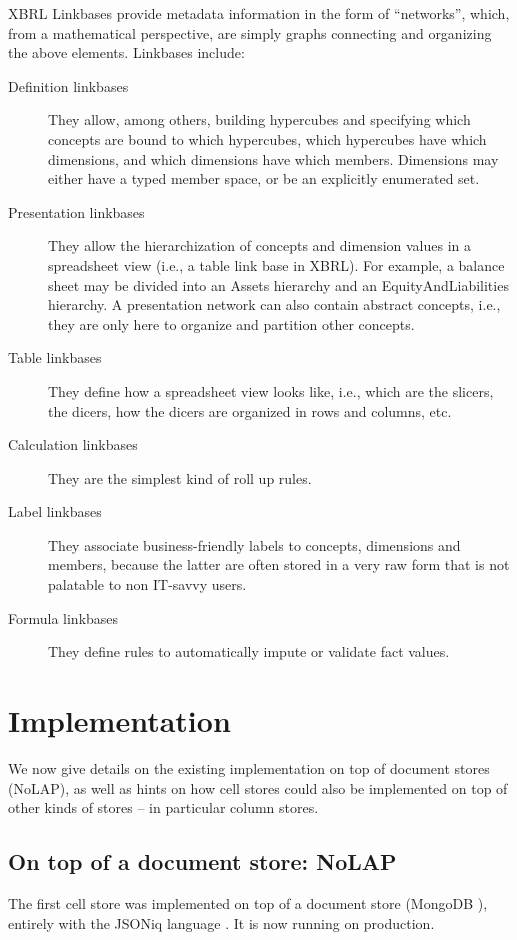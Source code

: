 \documentclass{acm_proc_article-sp}
\begin{document}
XBRL Linkbases provide metadata information in the form of ``networks'', which, from a mathematical perspective, are simply graphs connecting and organizing the above elements. Linkbases include:

\begin{description}
\item[Definition linkbases] They allow, among others, building hypercubes and specifying which concepts are bound to which hypercubes, which hypercubes have which dimensions, and which dimensions have which members. Dimensions may either have a typed member space, or be an explicitly enumerated set. 
\item[Presentation linkbases] They allow the hierarchization of concepts and dimension values in a spreadsheet view (i.e., a table link base in XBRL). For example, a balance sheet may be divided into an Assets hierarchy and an EquityAndLiabilities hierarchy. A presentation network can also contain abstract concepts, i.e., they are only here to organize and partition other concepts. 
\item[Table linkbases] They define how a spreadsheet view looks like, i.e., which are the slicers, the dicers, how the dicers are organized in rows and columns, etc.
\item[Calculation linkbases] They are the simplest kind of roll up rules.
\item[Label linkbases] They associate business-friendly labels to concepts, dimensions and members, because the latter are often stored in a very raw form that is not palatable to non IT-savvy users.
\item[Formula linkbases] They define rules to automatically impute or validate fact values.
\end{description}

\section{Implementation}
We now give details on the existing implementation on top of document stores (NoLAP), as well as hints on how cell stores could also be implemented on top of other kinds of stores -- in particular column stores.
\label{section-implementation}

\subsection{On top of a document store: NoLAP}

The first cell store was implemented on top of a document store (MongoDB \cite{MongoDB}), entirely with the JSONiq language \cite{JSONiq}. It is now running on production.
\end{document}
